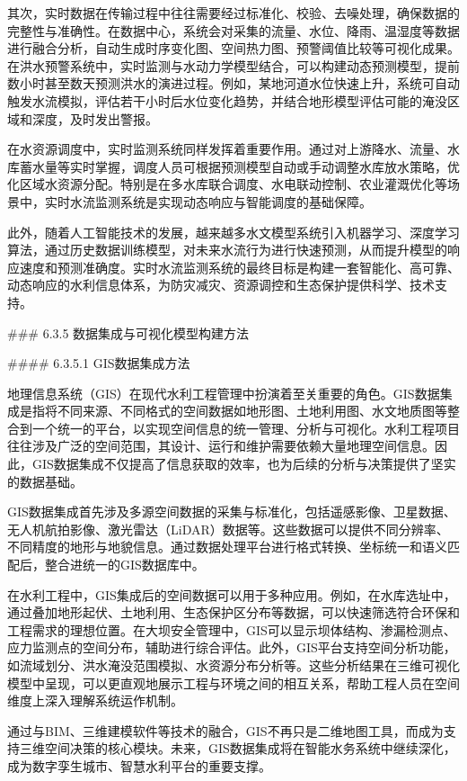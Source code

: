 其次，实时数据在传输过程中往往需要经过标准化、校验、去噪处理，确保数据的完整性与准确性。在数据中心，系统会对采集的流量、水位、降雨、温湿度等数据进行融合分析，自动生成时序变化图、空间热力图、预警阈值比较等可视化成果。在洪水预警系统中，实时监测与水动力学模型结合，可以构建动态预测模型，提前数小时甚至数天预测洪水的演进过程。例如，某地河道水位快速上升，系统可自动触发水流模拟，评估若干小时后水位变化趋势，并结合地形模型评估可能的淹没区域和深度，及时发出警报。

在水资源调度中，实时监测系统同样发挥着重要作用。通过对上游降水、流量、水库蓄水量等实时掌握，调度人员可根据预测模型自动或手动调整水库放水策略，优化区域水资源分配。特别是在多水库联合调度、水电联动控制、农业灌溉优化等场景中，实时水流监测系统是实现动态响应与智能调度的基础保障。

此外，随着人工智能技术的发展，越来越多水文模型系统引入机器学习、深度学习算法，通过历史数据训练模型，对未来水流行为进行快速预测，从而提升模型的响应速度和预测准确度。实时水流监测系统的最终目标是构建一套智能化、高可靠、动态响应的水利信息体系，为防灾减灾、资源调控和生态保护提供科学、技术支持。

\#\#\# 6.3.5 数据集成与可视化模型构建方法

\#\#\#\# 6.3.5.1 GIS数据集成方法

地理信息系统（GIS）在现代水利工程管理中扮演着至关重要的角色。GIS数据集成是指将不同来源、不同格式的空间数据如地形图、土地利用图、水文地质图等整合到一个统一的平台，以实现空间信息的统一管理、分析与可视化。水利工程项目往往涉及广泛的空间范围，其设计、运行和维护需要依赖大量地理空间信息。因此，GIS数据集成不仅提高了信息获取的效率，也为后续的分析与决策提供了坚实的数据基础。

GIS数据集成首先涉及多源空间数据的采集与标准化，包括遥感影像、卫星数据、无人机航拍影像、激光雷达（LiDAR）数据等。这些数据可以提供不同分辨率、不同精度的地形与地貌信息。通过数据处理平台进行格式转换、坐标统一和语义匹配后，整合进统一的GIS数据库中。

在水利工程中，GIS集成后的空间数据可以用于多种应用。例如，在水库选址中，通过叠加地形起伏、土地利用、生态保护区分布等数据，可以快速筛选符合环保和工程需求的理想位置。在大坝安全管理中，GIS可以显示坝体结构、渗漏检测点、应力监测点的空间分布，辅助进行综合评估。此外，GIS平台支持空间分析功能，如流域划分、洪水淹没范围模拟、水资源分布分析等。这些分析结果在三维可视化模型中呈现，可以更直观地展示工程与环境之间的相互关系，帮助工程人员在空间维度上深入理解系统运作机制。

通过与BIM、三维建模软件等技术的融合，GIS不再只是二维地图工具，而成为支持三维空间决策的核心模块。未来，GIS数据集成将在智能水务系统中继续深化，成为数字孪生城市、智慧水利平台的重要支撑。

